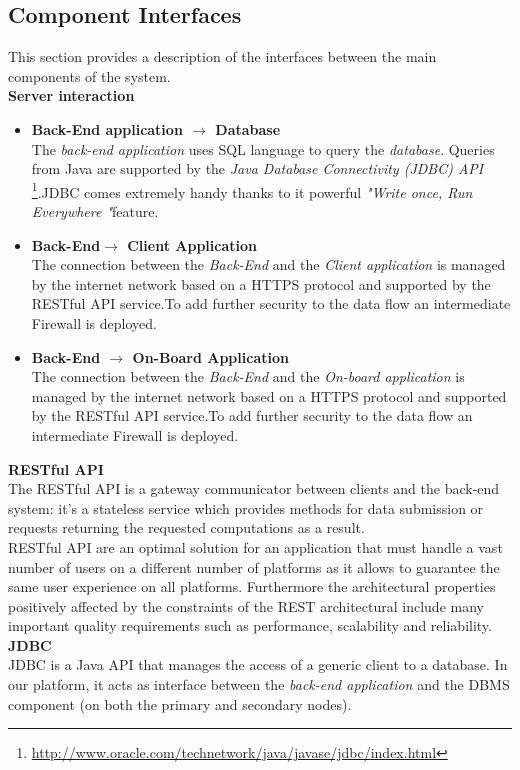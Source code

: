 \subsection{Component Interfaces}
\label{sec:CInter}
This section provides a description of the interfaces between the main components
of the system.
\\[0.2in]
\textbf{Server interaction}\\
\begin{itemize}
\item \textbf{Back-End application $\rightarrow$ Database}\\
The \emph{back-end application} uses SQL language to query the \emph{database}. Queries from Java 
are supported by the \emph{Java Database Connectivity (JDBC) API} \footnote{\url{http://www.oracle.com/technetwork/java/javase/jdbc/index.html}}.JDBC comes extremely handy thanks to it powerful \emph{"Write once, Run Everywhere "}feature.
\item \textbf{Back-End$\rightarrow$ Client Application}\\
The connection between the \emph{Back-End} and the \emph{Client application} is managed by the internet network based on a HTTPS protocol and supported by the RESTful API service.To add further security to the data flow an intermediate Firewall is deployed.
\item \textbf{Back-End $\rightarrow$ On-Board Application}\\
The connection between the \emph{Back-End} and the \emph{On-board application} is managed by the internet network based on a HTTPS protocol and supported by the RESTful API service.To add further security to the data flow an intermediate Firewall is deployed.
\end{itemize}
\textbf{RESTful API}\\The RESTful API is a gateway communicator between clients and the back-end system: it's a stateless service which provides methods for data submission or requests returning the requested computations as a result.\\
RESTful API are an optimal solution for an application that must handle a vast number of users on a different number of platforms as it allows to guarantee the same user experience on all platforms. Furthermore the architectural properties positively affected by the constraints of the REST architectural include many important quality requirements such as performance, scalability and reliability.\\[0.2in]
\textbf{JDBC}\\
JDBC is a Java API that manages the access of a generic client to a database. In
our platform, it acts as interface between the \emph{back-end application} and the
DBMS component (on both the primary and secondary nodes).
